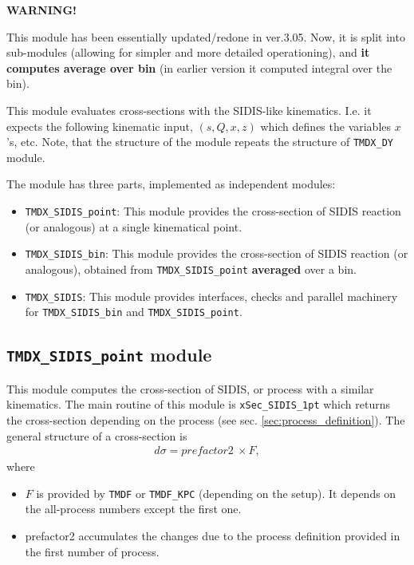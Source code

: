 \documentclass[prd,nofootinbib,eqsecnum,final]{revtex4}
\renewcommand{\(}{\left(}
\renewcommand{\)}{\right)}
\renewcommand{\[}{\left[}
\renewcommand{\]}{\right]}
\begin{document}
\begin{tcolorbox}
\begin{center}
\textbf{WARNING!}
\end{center}
This module has been essentially updated/redone in ver.3.05. Now, it is split into sub-modules (allowing for simpler and more detailed operationing), and \textbf{it computes average over bin} (in earlier version it computed integral over the bin). 
\end{tcolorbox}

This module evaluates cross-sections with the SIDIS-like kinematics. I.e. it expects the following kinematic input, $(s,Q,x,z)$ which defines the variables $x$'s, etc. Note, that the structure of the module repeats the structure of \texttt{TMDX{\_}DY} module.

The module has three parts, implemented as independent modules:
\begin{itemize}
\item \texttt{TMDX\_SIDIS\_point}: This module provides the cross-section of SIDIS reaction (or analogous) at a single kinematical point.
\item \texttt{TMDX\_SIDIS\_bin}: This module provides the cross-section of SIDIS reaction (or analogous), obtained from \texttt{TMDX\_SIDIS\_point} \textbf{averaged} over a bin.
\item \texttt{TMDX\_SIDIS}: This module provides interfaces, checks and parallel machinery for \texttt{TMDX\_SIDIS\_bin} and \texttt{TMDX\_SIDIS\_point}.
\end{itemize}


\subsection{\texttt{TMDX{\_}SIDIS{\_}point} module}

This module computes the cross-section of SIDIS, or process with a similar kinematics. The main routine of this module is \texttt{xSec\_SIDIS\_1pt} which returns the cross-section depending on the process (see sec. \ref{sec:process_definition}). The general structure of a cross-section is
\begin{eqnarray}
d\sigma = prefactor2~\times F,
\end{eqnarray}
where
\begin{itemize}
\item $F$ is provided by \texttt{TMDF} or \texttt{TMDF\_KPC} (depending on the setup). It depends on the all-process numbers except the first one.
\item prefactor2 accumulates the changes due to the process definition provided in the first number of process.
\end{itemize}
\end{document}
